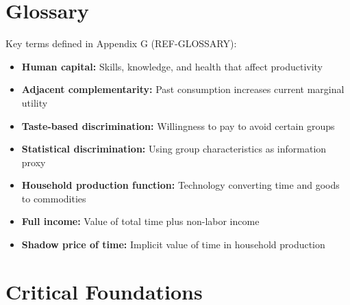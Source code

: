 \section{Glossary}
\label{sec:gb-glossary}

Key terms defined in Appendix G (REF-GLOSSARY):

\begin{itemize}
    \item \textbf{Human capital:} Skills, knowledge, and health that affect productivity
    \item \textbf{Adjacent complementarity:} Past consumption increases current marginal utility
    \item \textbf{Taste-based discrimination:} Willingness to pay to avoid certain groups
    \item \textbf{Statistical discrimination:} Using group characteristics as information proxy
    \item \textbf{Household production function:} Technology converting time and goods to commodities
    \item \textbf{Full income:} Value of total time plus non-labor income
    \item \textbf{Shadow price of time:} Implicit value of time in household production
\end{itemize}

\section{Critical Foundations}
\label{sec:gb-foundations}


